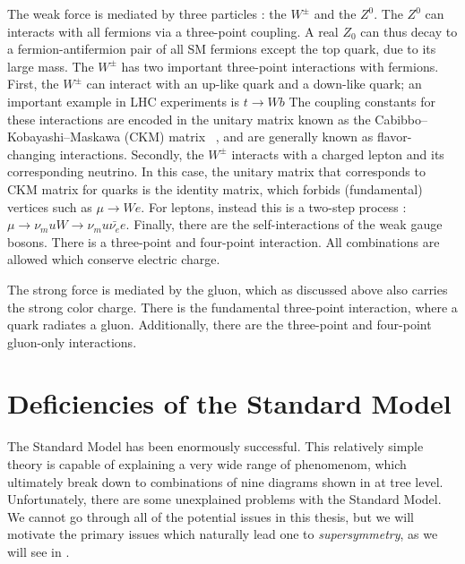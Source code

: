 The weak force is mediated by three particles : the $W^\pm$ and the $Z^0$.
The $Z^0$ can interacts with all fermions via a three-point coupling.
A real $Z_0$ can thus decay to a fermion-antifermion pair of all SM fermions except the top quark, due to its large mass.
The $W^\pm$ has two important three-point interactions with fermions.
First, the $W^\pm$ can interact with an up-like quark and a down-like quark; an important example in LHC experiments is $t \rightarrow Wb$
The coupling constants for these interactions are encoded in the unitary matrix known as the Cabibbo–Kobayashi–Maskawa (CKM) matrix ~\cite{Cabibbo:1963yz,Kobayashi:1973fv}, and are generally known as flavor-changing interactions.
Secondly, the $W^\pm$ interacts with a charged lepton and its corresponding neutrino.
In this case, the unitary matrix that corresponds to CKM matrix for quarks is the identity matrix, which forbids (fundamental) vertices such as $\mu \rightarrow We$.
For leptons, instead this is a two-step process : $\mu \rightarrow \nu_mu W \rightarrow \nu_mu \bar{\nu_e} e$.
Finally, there are the self-interactions of the weak gauge bosons.
There is a three-point and four-point interaction.
All combinations are allowed which conserve electric charge.

The strong force is mediated by the gluon, which as discussed above also carries the strong color charge.
There is the fundamental three-point interaction, where a quark radiates a gluon.
Additionally, there are the three-point and four-point gluon-only interactions.

\section{Deficiencies of the Standard Model}

The Standard Model has been enormously successful.
This relatively simple theory is capable of explaining a very wide range of phenomenom, which ultimately break down to combinations of nine diagrams shown in  at tree level.
Unfortunately, there are some unexplained problems with the Standard Model.
We cannot go through all of the potential issues in this thesis, but we will motivate the primary issues which naturally lead one to \textit{supersymmetry}, as we will see in .

